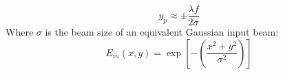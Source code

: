 \begin{equation}
y_p \approx \pm \frac{\lambda f}{2 \sigma}
\label{eqn:pi-plate-separation}
\end{equation}
Where $\sigma$ is the beam size of an equivalent Gaussian input beam:
\begin{equation}
E_{in}(x,y) = \exp \left[ - \left( \frac{x^2+y^2}{\sigma^2} \right) \right]
\label{eqn:gaussian_profile}
\end{equation}
%
